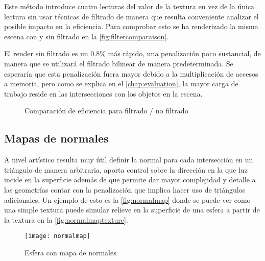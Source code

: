 Este método introduce cuatro lecturas del valor de la textura en vez de la única lectura sin usar técnicas de filtrado de manera que resulta conveniente analizar el posible impacto en la eficiencia. Para comprobar esto se ha renderizado la misma escena con y sin filtrado en la \autoref{fig:filtercomparaison}. 
	
El render sin filtrado es un 0.8\% más rápido, una penalización poco sustancial, de manera que se utilizará el filtrado bilinear de manera predeterminada. Se esperaría que esta penalización fuera mayor debido a la multiplicación de accesos a memoria, pero como se explica en el \autoref{chap:evaluation}, la mayor carga de trabajo reside en las intersecciones con los objetos en la escena.

\begin{figure}[H]
\centering
{}
\caption{Comparación de eficiencia para filtrado / no filtrado}
\label{fig:filtercomparaison}
\end{figure}
	
\subsection{Mapas de normales}
		
A nivel artístico resulta muy útil definir la normal para cada intersección en un triángulo de manera arbitraria, aporta control sobre la dirección en la que luz incide en la superficie además de que permite dar mayor complejidad y detalle a las geometrías contar con la penalización que implica hacer uso de triángulos adicionales. Un ejemplo de esto es la \autoref{fig:normalmap} donde se puede ver como una simple textura puede simular relieve en la superficie de una esfera a partir de la textura en la \autoref{fig:normalmaptexture}. 
	
		
\begin{figure}[H]
    \centering
	\texttt{[image: normalmap]}
	\caption{Esfera con mapa de normales}
	\label{fig:normalmap}
\end{figure}

